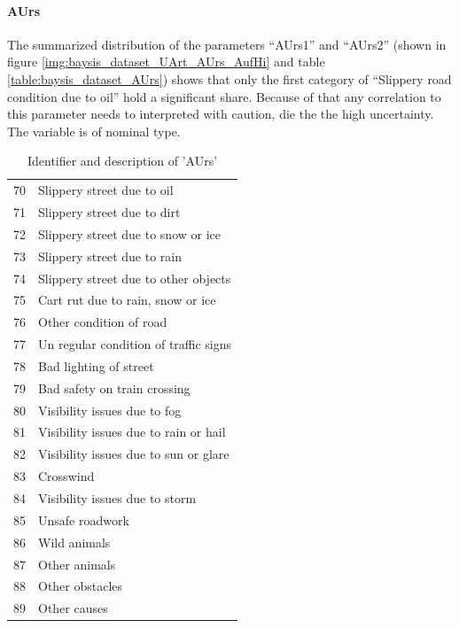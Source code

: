 \paragraph{AUrs}
The summarized distribution of the parameters “AUrs1” and “AUrs2” (shown in figure \autoref{img:baysis_dataset_UArt_AUrs_AufHi} and table \autoref{table:baysis_dataset_AUrs}) shows that only the first category of “Slippery road condition due to oil” hold a significant share. Because of that any correlation to this parameter needs to interpreted with caution, die the the high uncertainty. The variable is of nominal type.
\noindent
\begin{table}[ht]
	\centering
	\begin{tabular}{c|l}  
	70 & Slippery street due to oil \\
	71 & Slippery street due to dirt \\
	72 & Slippery street due to snow or ice \\
	73 & Slippery street due to rain \\
	74 & Slippery street due to other objects \\
	75 & Cart rut due to rain, snow or ice \\
	76 & Other condition of road \\
	77 & Un regular condition of traffic signs \\
	78 & Bad lighting of street \\
	79 & Bad safety on train crossing \\
	80 & Visibility issues due to fog \\
	81 & Visibility issues due to rain or hail \\
	82 & Visibility issues due to sun or glare \\
	83 & Crosswind \\
	84 & Visibility issues due to storm \\
	85 & Unsafe roadwork \\
	86 & Wild animals \\
	87 & Other animals \\
	88 & Other obstacles \\
	89 & Other causes \\
	\end{tabular}
	\caption{Identifier and description of 'AUrs'}
	\label{table:baysis_dataset_AUrs}
\end{table}

